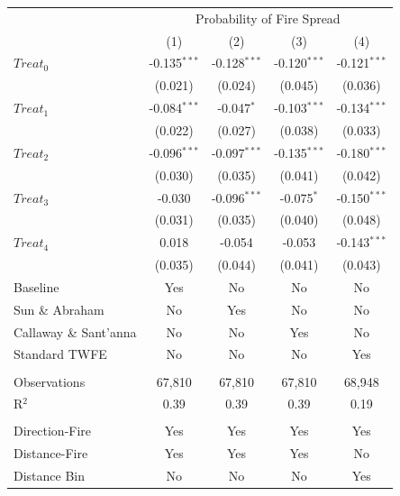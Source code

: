 \begingroup
\centering
\begin{tabular}{lcccc}
   \toprule
    & \multicolumn{4}{c}{Probability of Fire Spread}\\
                          & (1)            & (2)            & (3)            & (4)\\  
   \midrule 
   $Treat_0$              & -0.135$^{***}$ & -0.128$^{***}$ & -0.120$^{***}$ & -0.121$^{***}$\\   
                          & (0.021)        & (0.024)        & (0.045)        & (0.036)\\   
   $Treat_1$              & -0.084$^{***}$ & -0.047$^{*}$   & -0.103$^{***}$ & -0.134$^{***}$\\   
                          & (0.022)        & (0.027)        & (0.038)        & (0.033)\\   
   $Treat_2$              & -0.096$^{***}$ & -0.097$^{***}$ & -0.135$^{***}$ & -0.180$^{***}$\\   
                          & (0.030)        & (0.035)        & (0.041)        & (0.042)\\   
   $Treat_3$              & -0.030         & -0.096$^{***}$ & -0.075$^{*}$   & -0.150$^{***}$\\   
                          & (0.031)        & (0.035)        & (0.040)        & (0.048)\\   
   $Treat_4$              & 0.018          & -0.054         & -0.053         & -0.143$^{***}$\\   
                          & (0.035)        & (0.044)        & (0.041)        & (0.043)\\   
   Baseline               & Yes            & No             & No             & No\\  
   Sun \& Abraham         & No             & Yes            & No             & No\\  
   Callaway \& Sant'anna  & No             & No             & Yes            & No\\  
   Standard TWFE          & No             & No             & No             & Yes\\  
    \\
   Observations           & 67,810         & 67,810         & 67,810         & 68,948\\  
   R$^2$                  & 0.39           & 0.39           & 0.39           & 0.19\\  
    \\
   Direction-Fire         & Yes            & Yes            & Yes            & Yes\\  
   Distance-Fire          & Yes            & Yes            & Yes            & No\\  
   Distance Bin           & No             & No             & No             & Yes\\  
   \bottomrule
\end{tabular}
\par\endgroup
